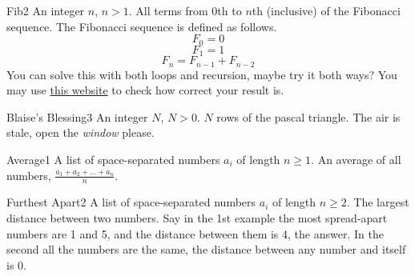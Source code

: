 \begin{task}{Fib}{2}
    \In
    An integer $n$, $n > 1$.
    \Out
    All terms from 0th to $n$th (inclusive) of the Fibonacci sequence.
    The Fibonacci sequence is defined as follows.
    $$F_0 = 0$$
    $$F_1 = 1$$
    $$F_n = F_{n - 1} + F_{n - 2}$$
    \Note
    You can solve this with both loops and recursion, maybe try it both ways?
    You may use \href{https://oeis.org/}{this website} to check how correct your result is.
    \begin{ExampleIO}
    \end{ExampleIO}
    \end{task}

    \begin{task}{Blaise's Blessing}{3}
    \In
    An integer $N$, $N > 0$.
    \Out
    $N$ rows of the pascal triangle.
    \Hint
    The air is stale, open the \textit{window} please.

    \begin{ExampleIO}
    \end{ExampleIO}
\end{task}


\begin{task}{Average}{1}
    \In
    A list of space-separated numbers $a_i$ of length $n \geq 1$. 
    \Out
    An average of all numbers, $\frac{a_1 + a_2 + \dots + a_n}{n}$.

    \begin{ExampleIO}
    \end{ExampleIO}
\end{task}


\begin{task}{Furthest Apart}{2}
    \In
    A list of space-separated numbers $a_i$ of length $n \geq 2$. 
    \Out
    The largest distance between two numbers.
    \Note 
    Say in the 1st example the most spread-apart numbers are 1 and 5, and the
    distance between them is 4, the answer. In the second all the numbers are the
    same, the distance between any number and itself is 0.
    \begin{ExampleIO}
    \end{ExampleIO}
\end{task}


